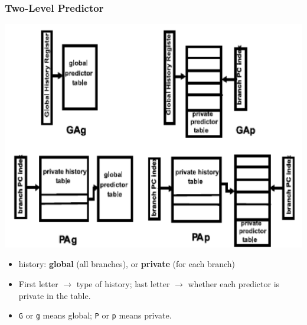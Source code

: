 \documentclass{beamer}
\newcommand{\emp}[1]{\textcolor{DikuRed}{ #1}}
\begin{document}
\begin{frame}[fragile,t]
\frametitle{Two-Level Predictor}

\includegraphics[width=44ex]{FigsOoOProc/TwoLevPredictor}
\vspace{-1ex}
\pause

%
%

\begin{itemize}
    \item history: \emp{\bf global} (all branches), or \emp{\bf private}
                (for each branch)
    \item First letter $\rightarrow$ type of history; last letter $\rightarrow$ whether each predictor is private in the table. 
     
        \item {\tt G} or {\tt g} means global; {\tt P} or {\tt p} means private.
\end{itemize}
\end{frame}
\end{document}
